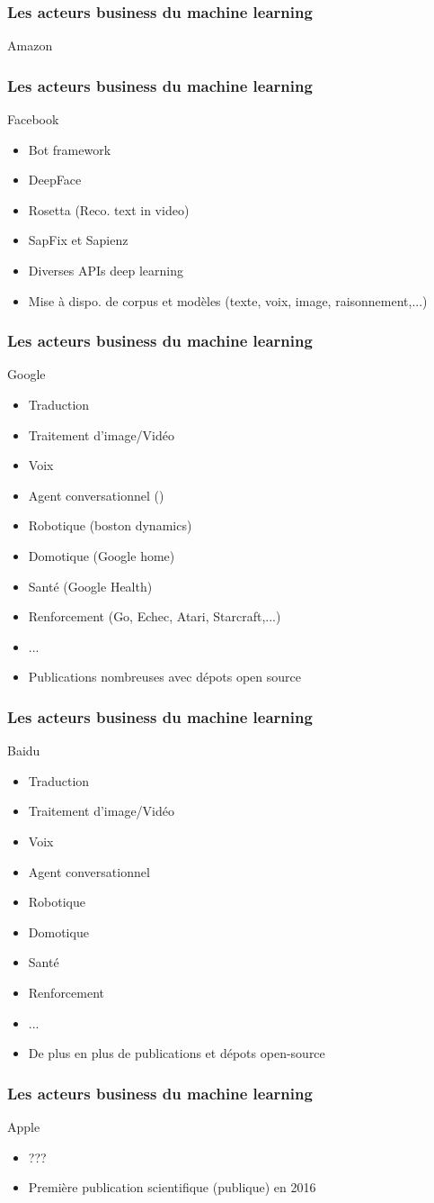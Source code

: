 \begin{frame}
  \frametitle{Les acteurs business du machine learning}
  Amazon
\end{frame}

\begin{frame}
  \frametitle{Les acteurs business du machine learning}
  Facebook
  \begin{itemize}
  \item Bot framework
  \item DeepFace
  \item Rosetta (Reco. text in video)
  \item SapFix et Sapienz 
  \item Diverses APIs deep learning
  \item Mise à dispo. de corpus et modèles (texte, voix, image, raisonnement,...)
  \end{itemize}
\end{frame}

\begin{frame}
  \frametitle{Les acteurs business du machine learning}
  Google
  \begin{itemize}
  \item Traduction
  \item Traitement d'image/Vidéo
  \item Voix
  \item Agent conversationnel (\href{https://www.youtube.com/watch?v=d40jgFZ5hXk}{})
  \item Robotique (boston dynamics)
  \item Domotique (Google home)
  \item Santé (Google Health)
  \item Renforcement (Go, Echec, Atari, Starcraft,...)
  \item ...
  \item Publications nombreuses avec dépots open source
  \end{itemize}
\end{frame}

\begin{frame}
  \frametitle{Les acteurs business du machine learning}
  Baidu
  \begin{itemize}
  \item Traduction
  \item Traitement d'image/Vidéo
  \item Voix
  \item Agent conversationnel
  \item Robotique
  \item Domotique
  \item Santé
  \item Renforcement
  \item ...
  \item De plus en plus de publications et dépots open-source
  \end{itemize}
\end{frame}

\begin{frame}
  \frametitle{Les acteurs business du machine learning}
  Apple
  \begin{itemize}
  \item ???
  \item Première publication scientifique (publique) en 2016
  \end{itemize}
\end{frame}
